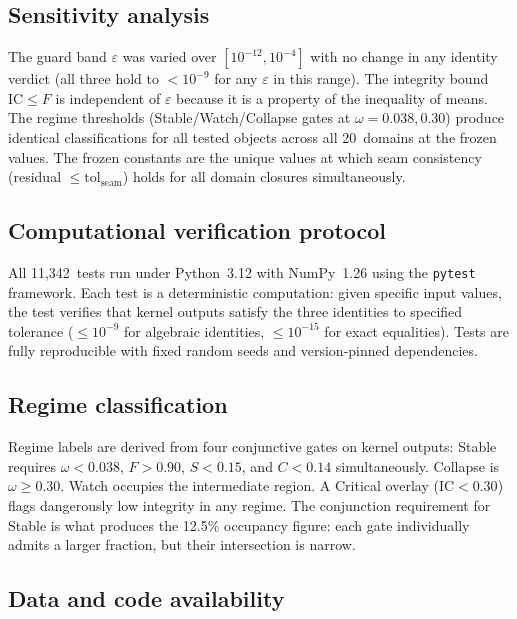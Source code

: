 \documentclass[
  aps,
  prx,
  twocolumn,
  superscriptaddress,
  nofootinbib,
  floatfix
]{revtex4-2}
\newcommand{\eps}{\varepsilon}
\newcommand{\IC}{\mathrm{IC}}
\begin{document}
\subsection{Sensitivity analysis}

The guard band $\eps$ was varied over $[10^{-12}, 10^{-4}]$ with
no change in any identity verdict (all three hold to
$< 10^{-9}$ for any $\eps$ in this range). The integrity bound
$\IC \leq F$ is independent of $\eps$ because it is a property of
the inequality of means. The regime thresholds (Stable/Watch/Collapse
gates at $\omega = 0.038, 0.30$) produce identical classifications
for all tested objects across all 20~domains at the frozen values.
The frozen constants are the unique values at which seam consistency
(residual $\leq \mathrm{tol}_{\mathrm{seam}}$) holds for all domain
closures simultaneously.

\subsection{Computational verification protocol}

All 11{,}342~tests run under Python~3.12 with NumPy~1.26 using
the \texttt{pytest} framework. Each test is a deterministic
computation: given specific input values, the test verifies that
kernel outputs satisfy the three identities to specified tolerance
($\leq 10^{-9}$ for algebraic identities, $\leq 10^{-15}$ for
exact equalities). Tests are fully reproducible with fixed random
seeds and version-pinned dependencies.

\subsection{Regime classification}

Regime labels are derived from four conjunctive gates on kernel
outputs: Stable requires $\omega < 0.038$, $F > 0.90$, $S < 0.15$,
and $C < 0.14$ simultaneously. Collapse is $\omega \geq 0.30$.
Watch occupies the intermediate region. A Critical overlay
($\IC < 0.30$) flags dangerously low integrity in any regime.
The conjunction requirement for Stable is what produces the 12.5\%
occupancy figure: each gate individually admits a larger fraction,
but their intersection is narrow.

\subsection{Data and code availability}
\end{document}
